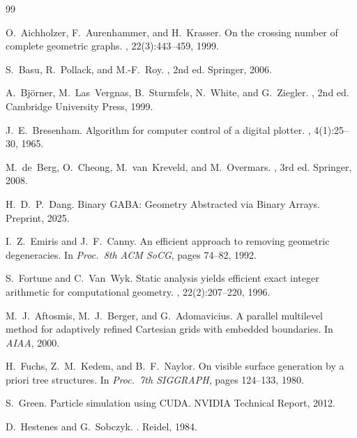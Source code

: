 \documentclass[11pt,letterpaper]{article}
\begin{document}

\begin{thebibliography}{99}

O.~Aichholzer, F.~Aurenhammer, and H.~Krasser.
\newblock On the crossing number of complete geometric graphs.
, 22(3):443--459, 1999.

S.~Basu, R.~Pollack, and M.-F.~Roy.
, 2nd ed.
\newblock Springer, 2006.

A.~Bj{\"o}rner, M.~Las~Vergnas, B.~Sturmfels, N.~White, and G.~Ziegler.
, 2nd ed.
\newblock Cambridge University Press, 1999.

J.~E.~Bresenham.
\newblock Algorithm for computer control of a digital plotter.
, 4(1):25--30, 1965.

M.~de~Berg, O.~Cheong, M.~van~Kreveld, and M.~Overmars.
, 3rd ed.
\newblock Springer, 2008.

H.~D.~P.~Dang.
\newblock Binary GABA: Geometry Abstracted via Binary Arrays.
\newblock Preprint, 2025.

I.~Z.~Emiris and J.~F.~Canny.
\newblock An efficient approach to removing geometric degeneracies.
\newblock In {\em Proc.\ 8th ACM SoCG}, pages 74--82, 1992.

S.~Fortune and C.~Van~Wyk.
\newblock Static analysis yields efficient exact integer arithmetic for
  computational geometry.
, 22(2):207--220, 1996.

M.~J.~Aftosmis, M.~J.~Berger, and G.~Adomavicius.
\newblock A parallel multilevel method for adaptively refined Cartesian grids
  with embedded boundaries.
\newblock In {\em AIAA}, 2000.

H.~Fuchs, Z.~M.~Kedem, and B.~F.~Naylor.
\newblock On visible surface generation by a priori tree structures.
\newblock In {\em Proc.\ 7th SIGGRAPH}, pages 124--133, 1980.

S.~Green.
\newblock Particle simulation using CUDA.
\newblock NVIDIA Technical Report, 2012.

D.~Hestenes and G.~Sobczyk.
.
\newblock Reidel, 1984.


\end{thebibliography}
\end{document}
